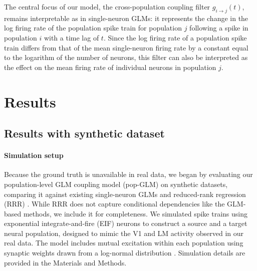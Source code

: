 \documentclass[12pt]{article}
\begin{document}
The central focus of our model, the cross-population coupling filter \( g_{i \rightarrow j}(t) \), remains interpretable as in single-neuron GLMs: it represents the change in the log firing rate of the population spike train for population \( j \) following a spike in population \( i \) with a time lag of \( t \). Since the log firing rate of a population spike train differs from that of the mean single-neuron firing rate by a constant equal to the logarithm of the number of neurons, this filter can also be interpreted as the effect on the mean firing rate of individual neurons in population \( j \).

\section{Results}

\subsection{Results with synthetic dataset}
\label{sec:Results with synthetic dataset}

\paragraph{Simulation setup} 
Because the ground truth is unavailable in real data, we began by evaluating our population-level GLM coupling model (pop-GLM) on synthetic datasets, comparing it against existing single-neuron GLMs \citep{yates2017functional, hart2020recurrent} and reduced-rank regression (RRR) \citep{semedo2019cortical}. While RRR does not capture conditional dependencies like the GLM-based methods, we include it for completeness. We simulated spike trains using exponential integrate-and-fire (EIF) neurons \citep{gerstner2014neuronal, huang2019circuit, fourcaud2003spike} to construct a source and a target neural population, designed to mimic the V1 and LM activity observed in our real data. The model includes mutual excitation within each population using synaptic weights drawn from a log-normal distribution \citep{song2005highly}. Simulation details are provided in the Materials and Methods.
\end{document}
